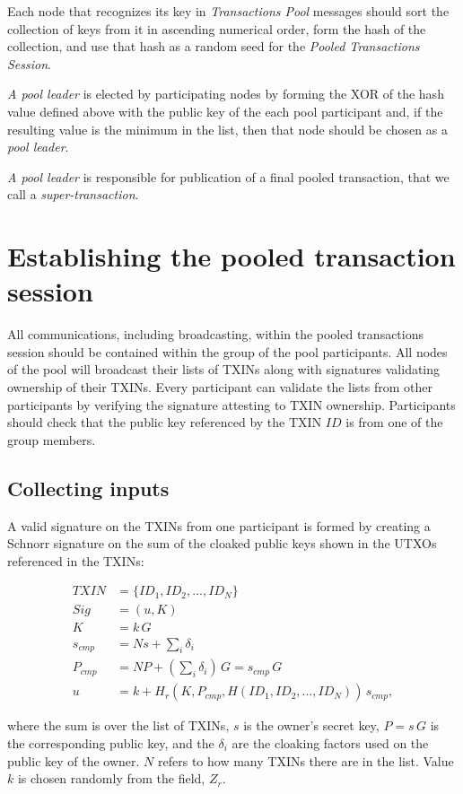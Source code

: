 \documentclass[8pt,fleqn,openany]{book}
\begin{document}
Each node that recognizes its key in \textit{Transactions Pool} messages should sort the collection of keys from it in ascending numerical order, form the hash of the collection, and use that hash as a random seed for the \textit{Pooled Transactions Session}.

\textit{A pool leader} is elected by participating nodes by forming the XOR of the hash value defined above with the public key of the each pool participant and, if the resulting value is the minimum in the list, then that node should be chosen as a \textit{pool leader}.

\textit{A pool leader} is responsible for publication of a final pooled transaction, that we call a \textit{super-transaction}.

\section{Establishing the pooled transaction session}
All communications, including broadcasting, within the pooled transactions session should be contained within the group of the pool participants. All nodes of the pool will broadcast their lists of TXINs along with signatures validating ownership of their TXINs. Every participant can validate the lists from other participants by verifying the signature attesting to TXIN ownership. Participants should check that the public key referenced by the TXIN $ID$ is from one of the group members.

\subsection{Collecting inputs} 
A valid signature on the TXINs from one participant is formed by creating a Schnorr signature on the sum of the cloaked public keys shown in the UTXOs referenced in the TXINs:

\begin{align*}
TXIN &= \{ID_1, ID_2, ..., ID_N\}\\
Sig &= (u, K)\\
K &= k \, G \\
s_{cmp} &= N s + \sum_i{\delta_i}\\
P_{cmp} &= N P + (\sum_i{\delta_i})\, G = s_{cmp} \, G\\
u &= k + H_r(K, P_{cmp}, H(ID_1, ID_2, ..., ID_N)) \, s_{cmp},
\end{align*}

where the sum is over the list of TXINs, $s$ is the owner’s secret key, $P = s \, G$ is the corresponding public key, and the $\delta_i$ are the cloaking factors used on the public key of the owner. $N$ refers to how many TXINs there are in the list. Value $k$ is chosen randomly from the field, $Z_r$. 
\end{document}
